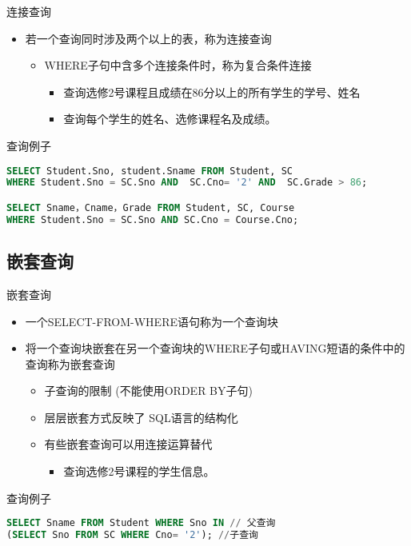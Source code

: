 \begin{frame}[fragile]{连接查询}
\begin{itemize}
    \item  若一个查询同时涉及两个以上的表，称为连接查询
 
    \begin{itemize}
        \item WHERE子句中含多个连接条件时，称为复合条件连接
        \begin{itemize}
            \item 查询选修2号课程且成绩在86分以上的所有学生的学号、姓名
            \item 查询每个学生的姓名、选修课程名及成绩。
        \end{itemize}

    \end{itemize}
\end{itemize}
\begin{block}{查询例子}
\begin{lstlisting}[language=SQL]
SELECT Student.Sno, student.Sname FROM Student, SC
WHERE Student.Sno = SC.Sno AND  SC.Cno= '2' AND  SC.Grade > 86;

SELECT Sname，Cname，Grade FROM Student, SC, Course
WHERE Student.Sno = SC.Sno AND SC.Cno = Course.Cno;

\end{lstlisting}
\end{block}
\end{frame}

\subsection{嵌套查询}
\begin{frame}[fragile]{嵌套查询}
\begin{itemize}
    \item  一个SELECT-FROM-WHERE语句称为一个查询块
    \item 将一个查询块嵌套在另一个查询块的WHERE子句或HAVING短语的条件中的查询称为嵌套查询
    
    \begin{itemize}
        \item 子查询的限制 (不能使用ORDER BY子句)
        \item 层层嵌套方式反映了 SQL语言的结构化
        \item 有些嵌套查询可以用连接运算替代
        \begin{itemize}
            \item 查询选修2号课程的学生信息。
        \end{itemize}

    \end{itemize}
\end{itemize}
\begin{block}{查询例子}
\begin{lstlisting}[language=SQL]
SELECT Sname FROM Student WHERE Sno IN // 父查询
(SELECT Sno FROM SC WHERE Cno= '2'); //子查询
\end{lstlisting}
\end{block}
\end{frame}

